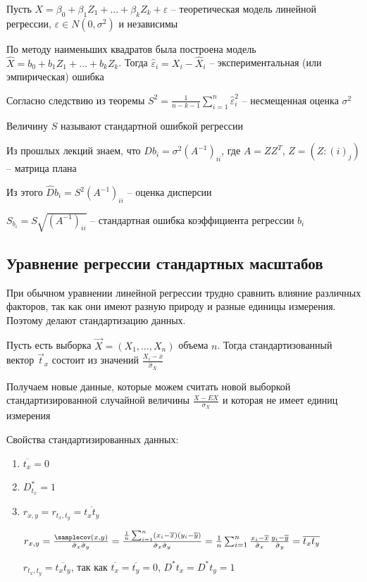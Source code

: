 Пусть $X = \beta_0 + \beta_1 Z_1 + \dots + \beta_k Z_k + \varepsilon$ -- теоретическая модель линейной регрессии, $\varepsilon \in N(0, \sigma^2)$ и независимы

По методу наименьших квадратов была построена модель $\hat X = b_0 + b_1 Z_1 + \dots + b_k Z_k$. Тогда $\hat \varepsilon_i = X_i - \hat X_i$ -- экспериментальная (или эмпирическая) ошибка

Согласно следствию из теоремы $S^2 = \frac{1}{n - k - 1} \sum_{i = 1}^n \hat \varepsilon_i^2$ -- несмещенная оценка $\sigma^2$

\Def Величину $S$ называют стандартной ошибкой регрессии 

Из прошлых лекций знаем, что $D b_i = \sigma^2 (A^{-1})_{ii}$, где $A = Z Z^T$, $Z = (Z:{(i)}_j)$ -- матрица плана

Из этого $\hat D b_i = S^2 (A^{-1})_{ii}$ -- оценка дисперсии

\Def $S_{b_i} = S \sqrt{(A^{-1})_{ii}}$ -- стандартная ошибка коэффициента регрессии $b_i$

\subsection{Уравнение регрессии стандартных масштабов}

\hypertarget{standard_regression_equation}{}

\Nota При обычном уравнении линейной регрессии трудно сравнить влияние различных факторов, так как они имеют 
разную природу и разные единицы измерения. Поэтому делают стандартизацию данных. 

Пусть есть выборка $\vec X = (X_1, \dots, X_n)$ объема $n$. Тогда стандартизованный вектор $\vec t_x$ состоит из значений $\frac{X_i - \overline{x}}{\hat \sigma_X}$

Получаем новые данные, которые можем считать новой выборкой стандартизированной случайной величины $\frac{X - EX}{\sigma_X}$ и которая не имеет единиц измерения

Свойства стандартизированных данных:

\begin{enumerate}
    \item $\overline{t_x} = 0$
    \item $D^*_{t_x} = 1$
    \item $r_{x,y} = r_{t_x, t_y} = \overline{t_x t_y}$
    \begin{MyProof}
        $r_{x,y} = \frac{\samplecov(x, y)}{\hat \sigma_x \hat \sigma_y} = 
        \frac{\frac{1}{n} \sum_{i = 1}^n (x_i - \overline{x})(y_i - \overline{y})}{\hat \sigma_x \hat \sigma_y} = 
        \frac{1}{n} \sum_{i = 1}^n \frac{x_i - \overline{x}}{\hat \sigma_x} \frac{y_i - \overline{y}}{\hat \sigma_y} = \overline{t_x t_y}$

        $r_{t_x, t_y} = \overline{t_x t_y}$, так как $\overline{t_x} = \overline{t_y} = 0$, $D^* t_x = D^* t_y = 1$
    \end{MyProof}
\end{enumerate}

